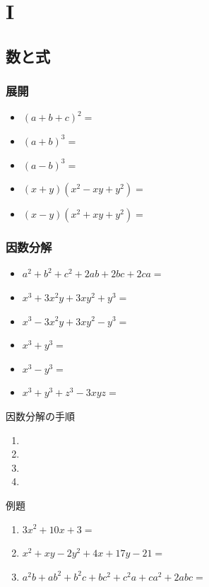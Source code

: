 \documentclass[10pt,dvipdfmx]{jsarticle}
\begin{document}
\section*{I}
\subsection*{数と式}
\subsubsection*{展開}
\begin{Large}
  \begin{itemize}
    \item $(a+b+c)^2=$
    \item $(a+b)^3=$
    \item $(a-b)^3=$
    \item $(x+y)(x^2-xy+y^2)=$
    \item $(x-y)(x^2+xy+y^2)=$
  \end{itemize}
\end{Large}

\subsubsection*{因数分解}
\begin{Large}
  \begin{itemize}
    \item $a^2+b^2+c^2+2ab+2bc+2ca=$
    \item $x^3+3x^2y+3xy^2+y^3=$
    \item  $x^3-3x^2y+3xy^2-y^3=$
    \item $x^3+y^3=$
    \item $x^3-y^3=$
    \item $x^3+y^3+z^3-3xyz=$
  \end{itemize}
\end{Large}
\begin{itembox}[l]{因数分解の手順}
  \begin{Large}
    \begin{enumerate}
      \item %
      \item %
      \item %
      \item %
    \end{enumerate}
  \end{Large}
\end{itembox}

\begin{itembox}[l]{例題}
  \begin{large}
    \begin{enumerate}
      \item $3x^2+10x+3=$
      \item $x^2+xy-2y^2+4x+17y-21=$
      \item $a^2b+ab^2+b^2c+bc^2+c^2a+ca^2+2abc=$
    \end{enumerate}
  \end{large}
\end{itembox}
\end{document}
